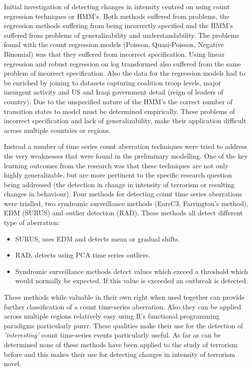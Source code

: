 Initial investigation of detecting changes in intensity centred on using count regression techniques or HMM's. Both methods suffered from problems, the regression methods suffering from being incorrectly specified and the HMM's suffered from problems of generalizability and understandability. The problems found with the count regression models (Poisson, Quasi-Poisson, Negative Binomial) was that they suffered from incorrect specification. Using linear regression  and robust regression on log transformed also suffered from the same problem of incorrect specification. Also the data for the regression models had to be enriched by joining to datasets capturing coalition troop levels, major insurgent activity and US and Iraqi government detail (reign of leaders of country). Due to the unspecified nature of the HMM's the correct number of transition states to model must be determined empirically. These problems of incorrect specification and lack of generalizability, make their application difficult across multiple countries or regions. 

Instead a number of time series count aberration techniques were tried to address the very weaknesses that were found in the preliminary modelling. One of the key learning outcomes from the research was that these techniques are not only highly generalizable, but are more pertinent to the specific research question being addressed (the detection in change in intensity of terrorism or resulting changes in behaviour). Four methods for detecting count time series aberrations were trialled, two syndromic surveillance methods (EarsC3, Farrington's method), EDM (SURUS) and outlier detection (RAD). These methods all detect different type of aberration:
\begin{itemize}
     \item SURUS, uses EDM and detects mean or gradual shifts.
     \item RAD, detects using PCA time series outliers.
     \item Syndromic surveillance methods detect values which exceed a threshold which would normally be expected. If this value is exceeded an outbreak is detected.
\end{itemize}     

These methods while valuable in their own right when used together can provide further classification of a count time-series aberration. Also they can be applied across multiple regions relatively easy using R's functional programming paradigms particularly purrr. These qualities make their use for the detection of \textit{'interesting'} count time-series events particularly useful. As far as can be determined none of these methods have been applied to the study of terrorism before and this makes their use for detecting changes in intensity of terrorism novel.

